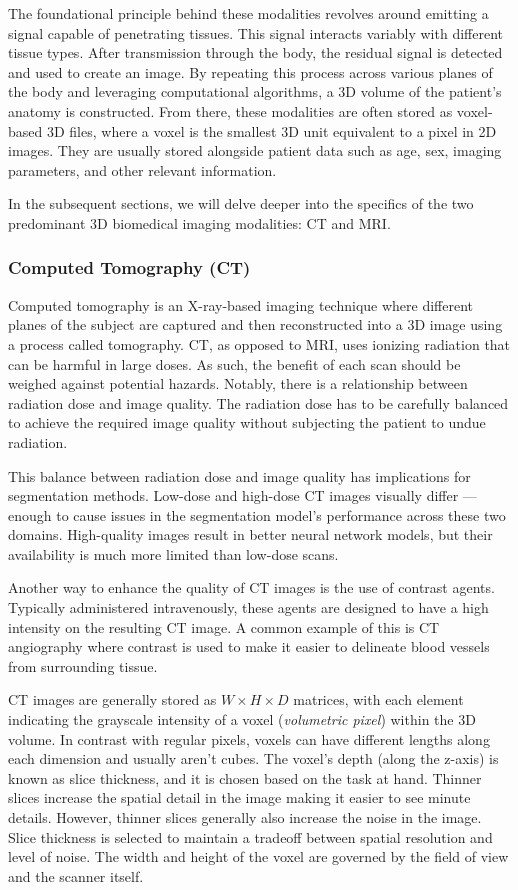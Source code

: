 The foundational principle behind these modalities revolves around emitting a signal capable of penetrating tissues. This signal interacts variably with different tissue types. After transmission through the body, the residual signal is detected and used to create an image. By repeating this process across various planes of the body and leveraging computational algorithms, a 3D volume of the patient's anatomy is constructed. From there, these modalities are often stored as voxel-based 3D files, where a voxel is the smallest 3D unit equivalent to a pixel in 2D images. They are usually stored alongside patient data such as age, sex, imaging parameters, and other relevant information.

In the subsequent sections, we will delve deeper into the specifics of the two predominant 3D biomedical imaging modalities: CT and MRI.

\subsubsection{Computed Tomography (CT)}

Computed tomography is an X-ray-based imaging technique where different planes of the subject are captured and then reconstructed into a 3D image using a process called tomography. CT, as opposed to MRI, uses ionizing radiation that can be harmful in large doses. As such, the benefit of each scan should be weighed against potential hazards. Notably, there is a relationship between radiation dose and image quality. The radiation dose has to be carefully balanced to achieve the required image quality without subjecting the patient to undue radiation.

This balance between radiation dose and image quality has implications for segmentation methods. Low-dose and high-dose CT images visually differ --- enough to cause issues in the segmentation model's performance across these two domains. High-quality images result in better neural network models, but their availability is much more limited than low-dose scans.

Another way to enhance the quality of CT images is the use of contrast agents. Typically administered intravenously, these agents are designed to have a high intensity on the resulting CT image. A common example of this is CT angiography where contrast is used to make it easier to delineate blood vessels from surrounding tissue.

CT images are generally stored as $W \times H \times D$ matrices, with each element indicating the grayscale intensity of a voxel (\textit{volumetric pixel}) within the 3D volume. In contrast with regular pixels, voxels can have different lengths along each dimension and usually aren't cubes. The voxel's depth (along the z-axis) is known as slice thickness, and it is chosen based on the task at hand. Thinner slices increase the spatial detail in the image making it easier to see minute details. However, thinner slices generally also increase the noise in the image. Slice thickness is selected to maintain a tradeoff between spatial resolution and level of noise. The width and height of the voxel are governed by the field of view and the scanner itself.

